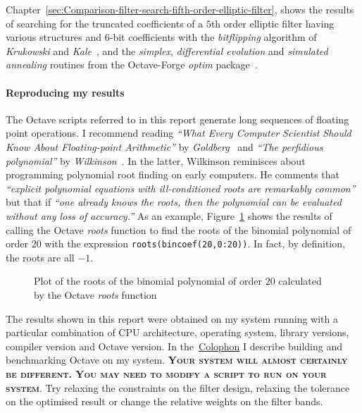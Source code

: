 \documentclass[a4paper,twoside,10pt,english]{report}
\begin{document}
Chapter~\ref{sec:Comparison-filter-search-fifth-order-elliptic-filter}, 
shows the results of searching for the truncated coefficients of a $5$th order 
elliptic filter having various structures and $6$-bit coefficients with the
\emph{bitflipping} algorithm of \emph{Krukowski} and
\emph{Kale}~\cite{KrukowskiKale_FixedPointFilterDesignBitFlippingSimplex}, and
the \emph{simplex}, \emph{differential evolution} and \emph{simulated annealing}
routines from the Octave-Forge \emph{optim} 
package~\cite{OctaveForge_OptimPackage}.

\paragraph{Reproducing my results}
The Octave scripts referred to in this report generate long sequences of floating
point operations. I recommend reading \emph{``What Every Computer Scientist
  Should Know About Floating-point Arithmetic''} by
\emph{Goldberg}~\cite{Goldberg_FloatingPoint} and \emph{``The perfidious
  polynomial''} by \emph{Wilkinson}~\cite{Wilkinson_PerfidiousPolynomial}. In
the latter, Wilkinson reminisces about programming polynomial root finding on
early computers. He comments that \emph{``explicit polynomial equations with
  ill-conditioned roots are remarkably common''} but that if \emph{``one
  already knows the roots, then the polynomial can be evaluated without any
  loss of accuracy.''} As an example, Figure~\ref{fig:bincoeff-test-zeros}
shows the results of calling the Octave \emph{roots} function to find the
roots of the binomial polynomial of order $20$ with the expression
\texttt{roots(bincoef(20,0:20))}. In fact, by definition, the roots are all
$-1$.
\begin{figure}[!htbp]
\begin{center}
\scalebox{0.7}{}
\caption{Plot of the roots of the binomial polynomial of order
      $20$ calculated by the Octave \emph{roots} function}
\label{fig:bincoeff-test-zeros}
\end{center}
\end{figure}

The results shown in this report were obtained on my system running with a
particular combination of CPU architecture, operating system, library
versions, compiler version and Octave version. In
the~\hyperlink{sec:Colophon}{Colophon} I describe building and benchmarking
Octave on my system. \textsc{\textbf{Your system will almost certainly be
    different. You may need to modify a script to run on your system}}. Try
relaxing the constraints on the filter design, relaxing the tolerance on the
optimised result or change the relative weights on the filter bands.
\cleardoublepage{}
\end{document}

